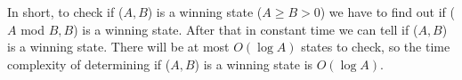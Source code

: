 \bigskip

In short, to check if ($A,B$) is a winning state ($A \geqslant B > 0$)
	we have to find out if ($A$ mod $B,B$) is a winning state.
After that in constant time we can tell if ($A,B$) is a winning state.
There will be at most $O(\log A)$ states to check,
	so the time complexity of determining if ($A,B$) is a winning state is $O(\log A)$.
